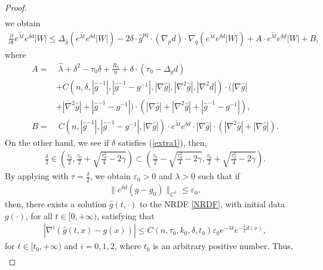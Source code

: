 \documentclass[12pt]{amsart}
\begin{document}
\begin{proof}
\begin{align}
\end{align}
we obtain
\begin{align}
    \frac{\partial }{\partial t} e^{\hat{\lambda} t} e^{\delta d}|W| \leq \Delta_{\hat{g}} \left( e^{\hat{\lambda} t}e^{\delta d}|W| \right) - 2\delta \cdot \hat{g}^{pq}\cdot (\nabla_p d) \cdot \nabla_q  \left( e^{\hat{\lambda} t}e^{\delta d}|W| \right) + A \cdot e^{\hat{\lambda} t} e^{\delta d}|W| + B,
\end{align}
where 
\begin{align*}
    A =&\; \hat{\lambda} +   \delta^2 - \tau_0 \delta + \frac{R_0}{n} + \delta\cdot (\tau_0 - \Delta_g d)\\
    &+ C(n, \delta, |\hat{g}^{-1}|, |\hat{g}^{-1} - g^{-1}|, |\nabla\hat{g}|, |\nabla^2 \hat{g}|, |\nabla^2 d|)\cdot(|\nabla\hat{g}|\\
    &+ |\nabla^2 \hat{g}| + |\hat{g}^{-1} - g^{-1}|)\cdot(|\nabla\hat{g}| + |\nabla^2 \hat{g}| + |\hat{g}^{-1} - g^{-1}|),\\
    B =&\; C(n, |\hat{g}^{-1}|, |\hat{g}^{-1} - g^{-1}|, |\nabla \hat{g}|)\cdot e^{\hat{\lambda} t}e^{\delta d} \cdot |\nabla \hat{g}|\cdot (|\nabla^2\hat{g}| + |\nabla \hat{g}|).
\end{align*}
On the other hand, we see if $\delta$ satisfies (\ref{extra1}), then,
\begin{align*}
    \frac{\delta}{2} \in \left( \frac{\tau_0}{2}, \frac{\tau_0}{2} + \sqrt{\frac{\tau_0^2}{4} - 2\gamma} \right) \subset \left( \frac{\tau_0}{2} - \sqrt{\frac{\tau_0^2}{4} - 2\gamma}, \frac{\tau_0}{2} + \sqrt{\frac{\tau_0^2}{4} - 2\gamma} \right).
\end{align*}
By applying  with $\tau = \frac{\delta}{2}$, we obtain $\varepsilon_0 > 0$ and $\lambda > 0$ such that if 
\begin{align*}
    \|e^{\delta d}(g - g_0)\|_{C^{1}} \leq \varepsilon_0,
\end{align*} 
then, there exists a solution \( \hat{g}(t, \cdot) \) to the NRDF \eqref{NRDF}, with initial data \( g(\cdot) \), for all \( t \in [0, +\infty) \), satisfying that  
\begin{align}
    |\nabla^{i}(\hat{g}(t, x) - g(x))| \leq C(n, \tau_0, k_0, \delta, t_0) \varepsilon_0 e^{-\lambda t} e^{-\frac{\delta}{2} d(x)},
\end{align}
for $t\in [t_0, +\infty)$ and $i = 0, 1, 2$, where $t_0$ is an arbitrary positive number. Thus, 
\begin{align}\label{The evolution equation of the deTurck term formula 1}

\end{align}
\end{proof}
\end{document}

